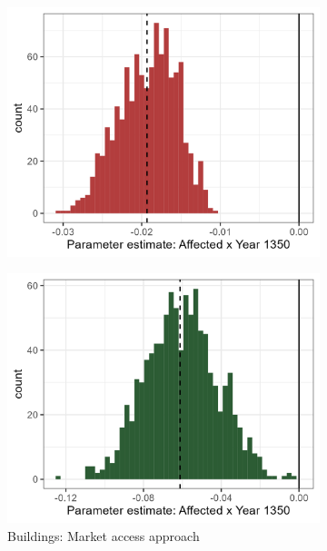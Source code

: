 \documentclass[11pt]{article}
\begin{document}
\begin{figure}
\begin{subfigure}[b]{0.45\textwidth}
        \includegraphics[width=\textwidth]{Plots/Regression_plots/arch_dummy_coins_boot.png}
    \end{subfigure}
    \vspace{0.45cm}
    \begin{subfigure}[b]{0.45\textwidth}
        \centering
        \caption{Buildings: Market access approach} \label{fig:distri_c}
        \includegraphics[width=\textwidth]{Plots/Regression_plots/arch_MA_buildings_boot.png}
    \end{subfigure}
    \hfill
    \begin{subfigure}[b]{0.45\textwidth}

\end{subfigure}
\end{figure}
\end{document}
